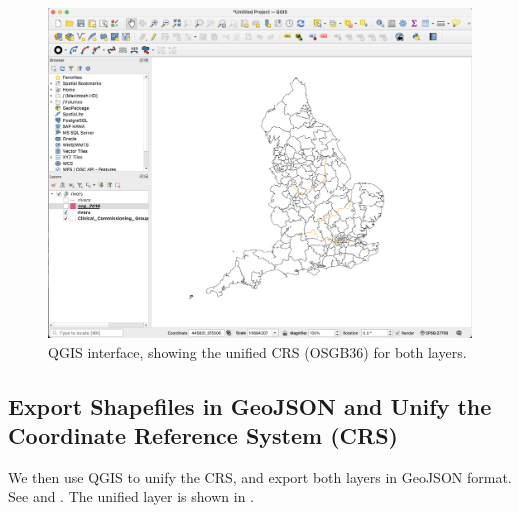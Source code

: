 \documentclass[Afour,sagev,times]{sagej}
\begin{document}
{\begin{figure}[H]
    \centering
    \includegraphics[width=\columnwidth]{unify_crs.png}
    \caption{QGIS interface, showing the unified CRS (OSGB36) for both layers.}
    \label{fig:unify_crs}
\end{figure}
}

\subsection{Export Shapefiles in GeoJSON and Unify the Coordinate Reference System (CRS)}

We then use QGIS to unify the CRS, and export both layers in GeoJSON format.
See  and .
The unified layer is shown in .
\end{document}
